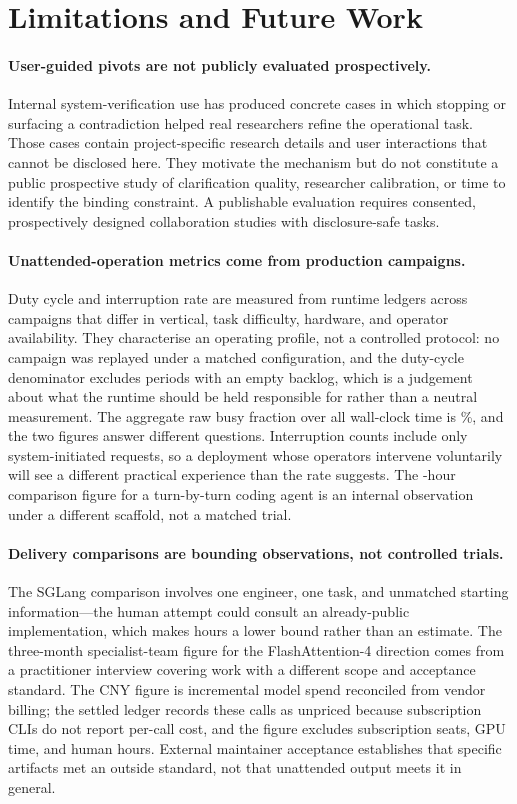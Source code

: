 \section{Limitations and Future Work}
\label{sec:limitations}

\paragraph{User-guided pivots are not publicly evaluated prospectively.}
Internal system-verification use has produced concrete cases in which stopping or
surfacing a contradiction helped real researchers refine the operational task.
Those cases contain project-specific research details and user interactions that
cannot be disclosed here. They motivate the mechanism but do not constitute a
public prospective study of clarification quality, researcher calibration, or time
to identify the binding constraint. A publishable evaluation requires consented,
prospectively designed collaboration studies with disclosure-safe tasks.

\paragraph{Unattended-operation metrics come from production campaigns.}
Duty cycle and interruption rate are measured from runtime ledgers across campaigns
that differ in vertical, task difficulty, hardware, and operator availability. They
characterise an operating profile, not a controlled protocol: no campaign was
replayed under a matched configuration, and the duty-cycle denominator excludes
periods with an empty backlog, which is a judgement about what the runtime should be
held responsible for rather than a neutral measurement. The aggregate raw busy
fraction over all wall-clock time is \DutyCycleRaw\%, and the two figures answer
different questions. Interruption counts include only system-initiated requests, so a
deployment whose operators intervene voluntarily will see a different practical
experience than the rate suggests. The \CodexEndurance{}-hour comparison figure for a
turn-by-turn coding agent is an internal observation under a different scaffold, not
a matched trial.

\paragraph{Delivery comparisons are bounding observations, not controlled trials.}
The SGLang comparison involves one engineer, one task, and unmatched starting
information---the human attempt could consult an already-public implementation, which
makes \SGLangHumanHours{} hours a lower bound rather than an estimate. The
three-month specialist-team figure for the FlashAttention-4 direction comes from a
practitioner interview covering work with a different scope and acceptance standard.
The \FlashDACostCNY{} CNY figure is incremental model spend reconciled from vendor
billing; the settled ledger records these calls as unpriced because subscription CLIs
do not report per-call cost, and the figure excludes subscription seats, GPU time,
and human hours. External maintainer acceptance establishes that specific artifacts
met an outside standard, not that unattended output meets it in general.

